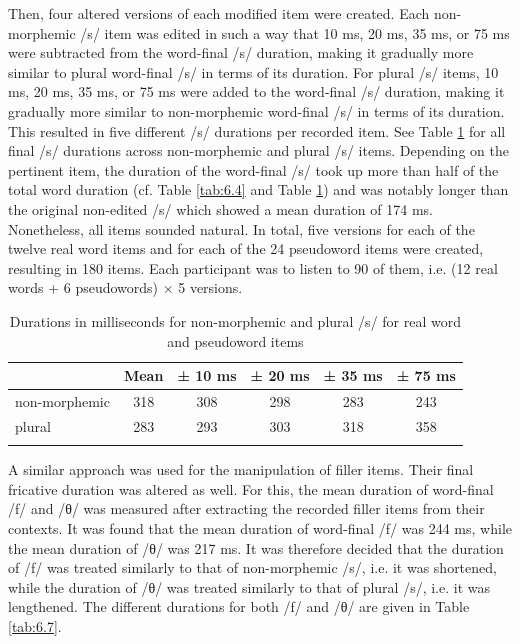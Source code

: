 Then, four altered versions of each modified item were created. Each non-morphemic /s/ item was edited in such a way that 10 ms, 20 ms, 35 ms, or 75 ms were subtracted from the word-final /s/ duration, making it gradually more similar to plural word-final /s/ in terms of its duration. For plural /s/ items, 10 ms, 20 ms, 35 ms, or 75 ms were added to the word-final /s/ duration, making it gradually more similar to non-morphemic word-final /s/ in terms of its duration. This resulted in five different /s/ durations per recorded item. See Table \ref{tab:6.6} for all final /s/ durations across non-morphemic and plural /s/ items. Depending on the pertinent item, the duration of the word-final /s/ took up more than half of the total word duration (cf. Table \ref{tab:6.4} and Table \ref{tab:6.6}) and was notably longer than the original non-edited /s/ which showed a mean duration of 174 ms. Nonetheless, all items sounded natural. In total, five versions for each of the twelve real word items and for each of the 24 pseudoword items were created, resulting in 180 items. Each participant was to listen to 90 of them, i.e. (12 real words + 6 pseudowords) × 5 versions.

\begin{table}\fontsize{10}{11}
\caption{Durations in milliseconds for non-morphemic and plural /s/ for real word and pseudoword items}
\label{tab:6.6}
\centering
\begin{tabular}{lccccc} 
\lsptoprule
~             & Mean & ± 10 ms & ± 20 ms & ± 35 ms & ± 75 ms  \\ 
\midrule
non-morphemic & 318  & 308     & 298     & 283     & 243      \\
plural        & 283  & 293     & 303     & 318     & 358      \\
\lspbottomrule
\end{tabular}
\end{table}

A similar approach was used for the manipulation of filler items. Their final fricative duration was altered as well. For this, the mean duration of word-final /f/ and /θ/ was measured after extracting the recorded filler items from their contexts. It was found that the mean duration of word-final /f/ was 244 ms, while the mean duration of /θ/ was 217 ms. It was therefore decided that the duration of /f/ was treated similarly to that of non-morphemic /s/, i.e. it was shortened, while the duration of /θ/ was treated similarly to that of plural /s/, i.e. it was lengthened. The different durations for both /f/ and /θ/ are given in Table \ref{tab:6.7}.


